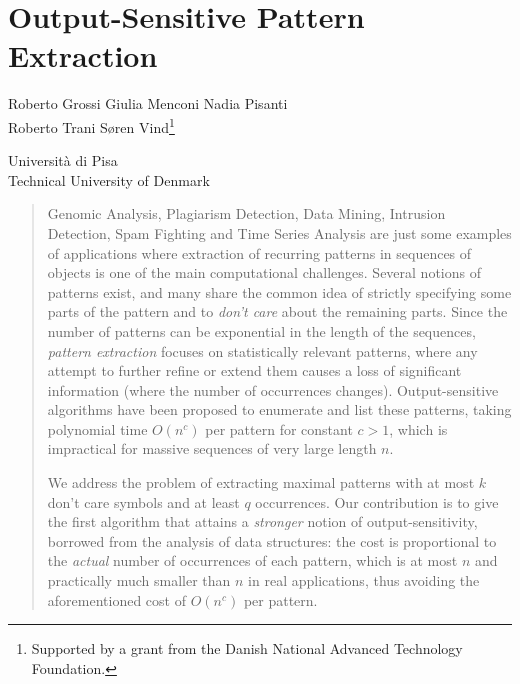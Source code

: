 \chapter[Output-Sensitive Pattern Extraction in Sequences]{Output-Sensitive Pattern Extraction}
\begin{infosection}
    \begin{authors}
        Roberto Grossi \qquad Giulia Menconi \qquad Nadia Pisanti \\  
        Roberto Trani \qquad S{\o}ren Vind\footnote{Supported by a grant from the Danish National Advanced Technology Foundation.}
    \end{authors}

    \begin{uninames}
         Universit\`{a} di Pisa \\
         Technical University of Denmark
    \end{uninames}

    \begin{abstract}
        Genomic Analysis, Plagiarism Detection, Data Mining, Intrusion Detection, Spam Fighting and Time Series Analysis are just some examples of applications where extraction of recurring patterns in sequences of objects is one of the main computational challenges.
        Several notions of patterns exist, and many share the common idea of strictly specifying some parts of the pattern and to \emph{don't care} about the remaining parts. Since the number of patterns can be exponential in the length of the sequences, \emph{pattern extraction} focuses on statistically relevant patterns, where any attempt to further refine or extend them causes a loss of significant information (where the number of occurrences changes).
    Output-sensitive algorithms have been proposed to enumerate and list these patterns, taking polynomial time $O(n^c)$ per pattern for constant $c >1$, which is impractical for massive sequences of very large length $n$.

        We address the problem of extracting maximal patterns with at most $k$ don't care symbols and at least $q$ occurrences. Our contribution is to give the first algorithm that attains a \emph{stronger} notion of output-sensitivity, borrowed from the analysis of data structures: the cost is proportional to the \emph{actual} number of occurrences of each pattern, which is at most $n$ and practically much smaller than $n$ in real applications, thus avoiding the aforementioned cost of $O(n^c)$ per pattern.
    \end{abstract}
\end{infosection}


